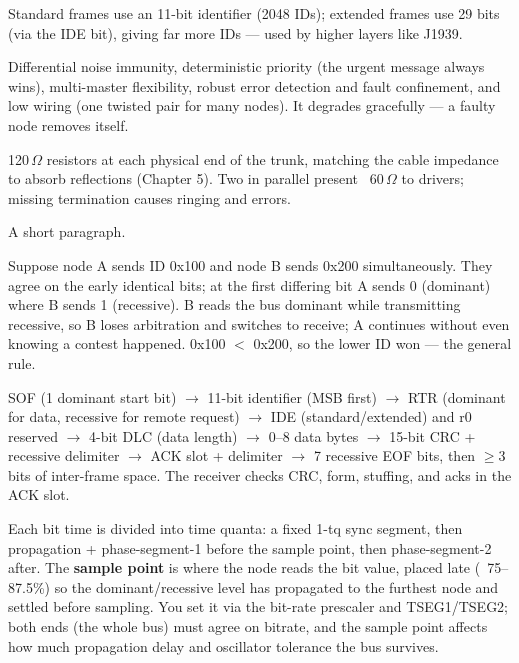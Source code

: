 Standard frames use an 11-bit identifier (2048 IDs); extended frames use 29 bits
(via the IDE bit), giving far more IDs --- used by higher layers like J1939.

Differential noise immunity, deterministic priority (the urgent message always
wins), multi-master flexibility, robust error detection and fault confinement,
and low wiring (one twisted pair for many nodes). It degrades gracefully ---
a faulty node removes itself.

120\,$\Omega$ resistors at each physical end of the trunk, matching the cable
impedance to absorb reflections (Chapter 5). Two in parallel present ~60\,$\Omega$
to drivers; missing termination causes ringing and errors.

%
{A short paragraph.}

Suppose node A sends ID 0x100 and node B sends 0x200 simultaneously. They agree
on the early identical bits; at the first differing bit A sends 0 (dominant)
where B sends 1 (recessive). B reads the bus dominant while transmitting
recessive, so B loses arbitration and switches to receive; A continues without
even knowing a contest happened. 0x100 $<$ 0x200, so the lower ID won --- the
general rule.

SOF (1 dominant start bit) $\rightarrow$ 11-bit identifier (MSB first)
$\rightarrow$ RTR (dominant for data, recessive for remote request)
$\rightarrow$ IDE (standard/extended) and r0 reserved $\rightarrow$ 4-bit DLC
(data length) $\rightarrow$ 0--8 data bytes $\rightarrow$ 15-bit CRC + recessive
delimiter $\rightarrow$ ACK slot + delimiter $\rightarrow$ 7 recessive EOF bits,
then $\geq$3 bits of inter-frame space. The receiver checks CRC, form, stuffing,
and acks in the ACK slot.

Each bit time is divided into time quanta: a fixed 1-tq sync segment, then
propagation + phase-segment-1 before the sample point, then phase-segment-2
after. The \textbf{sample point} is where the node reads the bit value, placed
late (~75--87.5\%) so the dominant/recessive level has propagated to the
furthest node and settled before sampling. You set it via the bit-rate
prescaler and TSEG1/TSEG2; both ends (the whole bus) must agree on bitrate, and
the sample point affects how much propagation delay and oscillator tolerance the
bus survives.

